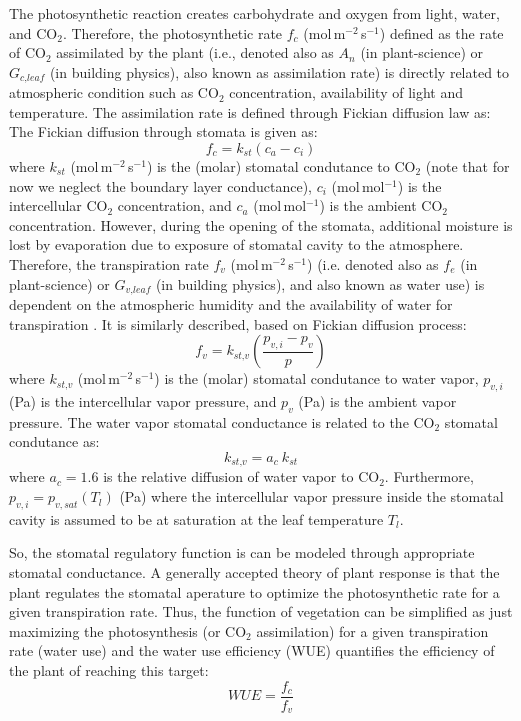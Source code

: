 The photosynthetic reaction creates carbohydrate and oxygen from light, water, and CO$_2$. Therefore, the photosynthetic rate $f_c$ (mol\,m$^{-2}$\,s$^{-1}$) defined as the rate of CO$_2$ assimilated by the plant (i.e., denoted also as $A_n$ (in plant-science) or $G_{\textit{c,leaf}}$ (in building physics), also known as assimilation rate) is directly related to atmospheric condition such as CO$_2$ concentration, availability of light and temperature. The assimilation rate is defined through Fickian diffusion law as:
The Fickian diffusion through stomata is given as:
\begin{equation}
f_c = k_{\textit{st}} \left(c_a - c_i\right)
\label{eq:fickassim}
\end{equation}
where $k_{st}$ (mol\,m$^{-2}$\,s$^{-1}$) is the (molar) stomatal condutance to CO$_2$ (note that for now we neglect the boundary layer conductance), $c_i$ (mol\,mol$^{-1}$) is the intercellular CO$_2$ concentration, and $c_a$ (mol\,mol$^{-1}$) is the ambient CO$_2$ concentration. However, during the opening of the stomata, additional moisture is lost by evaporation due to exposure of stomatal cavity to the atmosphere. Therefore, the transpiration rate $f_v$ (mol\,m$^{-2}$\,s$^{-1}$) (i.e. denoted also as $f_e$ (in plant-science) or $G_{\textit{v,leaf}}$ (in building physics), and also known as water use) is dependent on the atmospheric humidity and the availability of water for transpiration \citep{Ball1987,Leuning1995}. It is similarly described, based on Fickian diffusion process:
\begin{equation}
f_v = k_{\textit{st,v}} \left(\frac{p_{v,i} - p_v}{p}\right)
\label{eq:fv}
\end{equation}
where $k_{\textit{st,v}}$ (mol\,m$^{-2}$\,s$^{-1}$) is the (molar) stomatal condutance to water vapor, $p_{v,i}$ (Pa) is the intercellular vapor pressure, and $p_v$ (Pa) is the ambient vapor pressure. The water vapor stomatal conductance is related to the CO$_2$ stomatal condutance as:
\begin{equation}
k_{\textit{st,v}} = a_c ~ k_{\textit{st}}
\end{equation}
where $a_c = 1.6$ is the relative diffusion of water vapor to CO$_2$. Furthermore, $p_{v,i} = p_{v,sat}\left(T_l\right)$ (Pa) where the intercellular vapor pressure inside the stomatal cavity is assumed to be at saturation at the leaf temperature $T_l$. 

So, the stomatal regulatory function is can be modeled through appropriate stomatal conductance. A generally accepted theory of plant response is that the plant regulates the stomatal aperature to optimize the photosynthetic rate for a given transpiration rate. Thus, the function of vegetation can be simplified as just maximizing the photosynthesis (or CO$_2$ assimilation) for a given transpiration rate (water use) \citep{Medlyn2011} and the water use efficiency (WUE) quantifies the efficiency of the plant of reaching this target:
\begin{equation}
\textit{WUE} = \frac{f_c}{f_v}
\label{eq:wue}
\end{equation}

